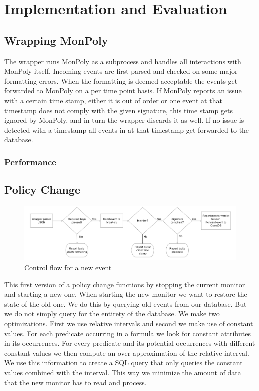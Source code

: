 \chapter{Implementation and Evaluation}

\section{Wrapping MonPoly}



The wrapper runs MonPoly as a subprocess and handles all interactions with MonPoly itself.
Incoming events are first parsed and checked on some major formatting errors.
When the formatting is deemed acceptable the events get forwarded to MonPoly on a per time point basis.
If MonPoly reports an issue with a certain time stamp, either it is out of order or one event at that timestamp does not comply with the given signature, this time stamp gets ignored by MonPoly, and in turn the wrapper discards it as well.
If no issue is detected with a timestamp all events in at that timestamp get forwarded to the database.

\subsection{Performance}


\section{Policy Change}
% 

\begin{figure}
    \label{fig:flowchart}
    \centering
    \includegraphics[width=\linewidth]{diagrams/flowchart-2.png}
    \caption{Control flow for a new event}
\end{figure}

This first version of a policy change functions by stopping the current monitor and starting a new one.
When starting the new monitor we want to restore the state of the old one.
We do this by querying old events from our database.
But we do not simply query for the entirety of the database.
We make two optimizations.
First we use relative intervals and second we make use of constant values.
For each predicate occurring in a formula we look for constant attributes in its occurrences.
For every predicate and its potential occurrences with different constant values we then compute an over approximation of the relative interval.
We use this information to create a SQL query that only queries the constant values combined with the interval.
This way we minimize the amount of data that the new monitor has to read and process.

